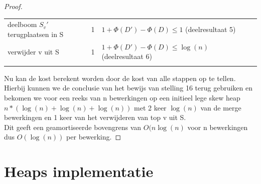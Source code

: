 \documentclass[10pt,a4paper,twoside]{article}
\begin{document}
\begin{proof}
\begin{table}[H]
\begin{tabular}{lllll}
\multicolumn{1}{|l|}{deelboom $S_v'$ terugplaatsen in S} & \multicolumn{1}{l|}{1}          & \multicolumn{1}{l|}{$1+\Phi(D')-\Phi(D)\leq1$ (deelresultaat 5)}        &  &  \\ \cline{1-3}
\multicolumn{1}{|l|}{verwijder v uit S}                  & \multicolumn{1}{l|}{1}          & \multicolumn{1}{l|}{$1+\Phi(D')-\Phi(D)\leq\log(n) $(deelresultaat 6)} &  &  \\ \cline{1-3}
                                                         &                                 &                                                       &  & 
\end{tabular}
\end{table}
Nu kan de kost berekent worden door de kost van alle stappen op te tellen. Hierbij kunnen we de conclusie van het bewijs van stelling 16 terug gebruiken en bekomen we voor een reeks van n bewerkingen op een initieel lege skew heap $n*(\log(n)+\log(n)+\log(n))$ met 2 keer $\log(n)$ van de merge bewerkingen en 1 keer van het verwijderen van top v uit S.\\
Dit geeft een geamortiseerde bovengrens van $O(n\log(n)$ voor n bewerkingen dus $O(\log(n))$ per bewerking.
\end{proof}
\newpage
\section{Heaps implementatie}
\end{document}
